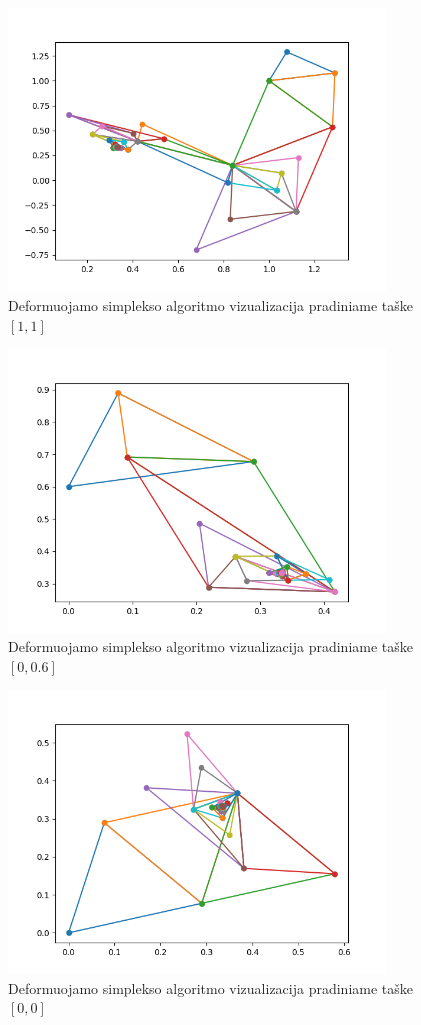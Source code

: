 \documentclass{VUMIFPSkursinis}
\begin{document}
\begin{figure}[H]
  \centering
  \includegraphics[width=10cm]{img/nelder_mead_better_triangles_[1.0,1.0].png}
  \caption{Deformuojamo simplekso algoritmo vizualizacija pradiniame taške $[1, 1]$}
  \label{img:nel-mead-11}
\end{figure}

\begin{figure}[H]
  \centering
  \includegraphics[width=10cm]{img/nelder_mead_better_triangles_[0.0,0.6].png}
  \caption{Deformuojamo simplekso algoritmo vizualizacija pradiniame taške $[0, 0.6]$}
  \label{img:nel-mead-69}
\end{figure}

\begin{figure}[H]
  \centering
  \includegraphics[width=10cm]{img/nelder_mead_better_triangles_[0.0,0.0].png}
  \caption{Deformuojamo simplekso algoritmo vizualizacija pradiniame taške $[0, 0]$}
  \label{img:nel-mead-00}
\end{figure}
\end{document}
